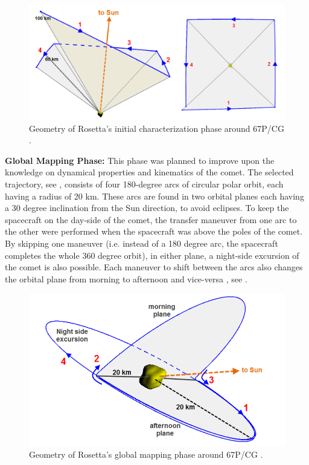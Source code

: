 \begin{figure}[h]
\centering
\captionsetup{justification=centering}
\includegraphics[scale=0.4]{rosettainitchartraj.png}
\caption{Geometry of Rosetta's initial characterization phase around 67P/CG \cite{rosettanew2012}.}
\label{fig:rosettainitchartraj}
\end{figure}

\textbf{Global Mapping Phase:} This phase was planned to improve upon the knowledge on dynamical properties and kinematics of the comet. The selected trajectory, see , consists of four 180-degree arcs of circular polar orbit, each having a radius of 20 km. These arcs are found in two orbital planes each having a 30 degree inclination from the Sun direction, to avoid eclipses. To keep the spacecraft on the day-side of the comet, the transfer maneuver from one arc to the other were performed when the spacecraft was above the poles of the comet. By skipping one maneuver (i.e. instead of a 180 degree arc, the spacecraft completes the whole 360 degree orbit), in either plane, a night-side excursion of the comet is also possible. Each maneuver to shift between the arcs also changes the orbital plane from morning to afternoon and vice-versa \cite{rosettanew2012}, see .

\begin{figure}[h]
\centering
\captionsetup{justification=centering}
\includegraphics[scale=0.5]{rosettaglobalmappingtraj.png}
\caption{Geometry of Rosetta's global mapping phase around 67P/CG \cite{rosettanew2012}.}
\label{fig:rosettaglobalmappingtraj}
\end{figure}

